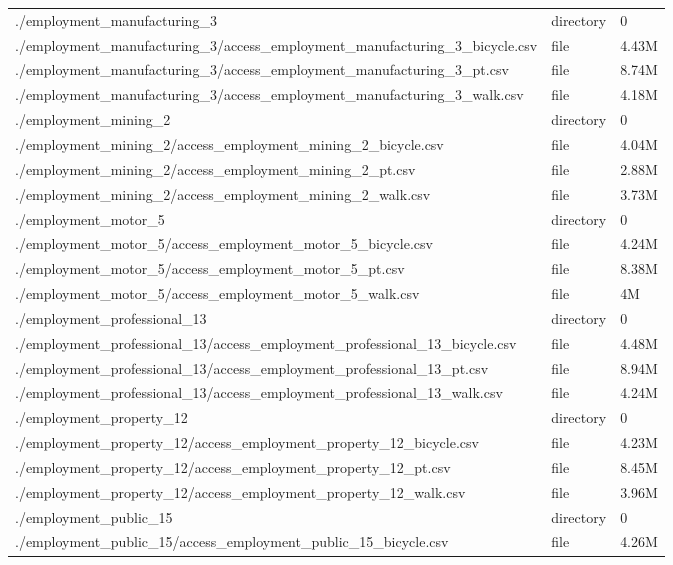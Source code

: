 \documentclass{article}
\begin{document}
\begin{longtable}[t]{>{\raggedright\arraybackslash}p{13cm}ll}
\addlinespace
./employment\_manufacturing\_3 & directory & 0\\
./employment\_manufacturing\_3/access\_employment\_manufacturing\_3\_bicycle.csv & file & 4.43M\\
./employment\_manufacturing\_3/access\_employment\_manufacturing\_3\_pt.csv & file & 8.74M\\
./employment\_manufacturing\_3/access\_employment\_manufacturing\_3\_walk.csv & file & 4.18M\\
./employment\_mining\_2 & directory & 0\\
\addlinespace
./employment\_mining\_2/access\_employment\_mining\_2\_bicycle.csv & file & 4.04M\\
./employment\_mining\_2/access\_employment\_mining\_2\_pt.csv & file & 2.88M\\
./employment\_mining\_2/access\_employment\_mining\_2\_walk.csv & file & 3.73M\\
./employment\_motor\_5 & directory & 0\\
./employment\_motor\_5/access\_employment\_motor\_5\_bicycle.csv & file & 4.24M\\
\addlinespace
./employment\_motor\_5/access\_employment\_motor\_5\_pt.csv & file & 8.38M\\
./employment\_motor\_5/access\_employment\_motor\_5\_walk.csv & file & 4M\\
./employment\_professional\_13 & directory & 0\\
./employment\_professional\_13/access\_employment\_professional\_13\_bicycle.csv & file & 4.48M\\
./employment\_professional\_13/access\_employment\_professional\_13\_pt.csv & file & 8.94M\\
\addlinespace
./employment\_professional\_13/access\_employment\_professional\_13\_walk.csv & file & 4.24M\\
./employment\_property\_12 & directory & 0\\
./employment\_property\_12/access\_employment\_property\_12\_bicycle.csv & file & 4.23M\\
./employment\_property\_12/access\_employment\_property\_12\_pt.csv & file & 8.45M\\
./employment\_property\_12/access\_employment\_property\_12\_walk.csv & file & 3.96M\\
\addlinespace
./employment\_public\_15 & directory & 0\\
./employment\_public\_15/access\_employment\_public\_15\_bicycle.csv & file & 4.26M\\

\end{longtable}
\end{document}
